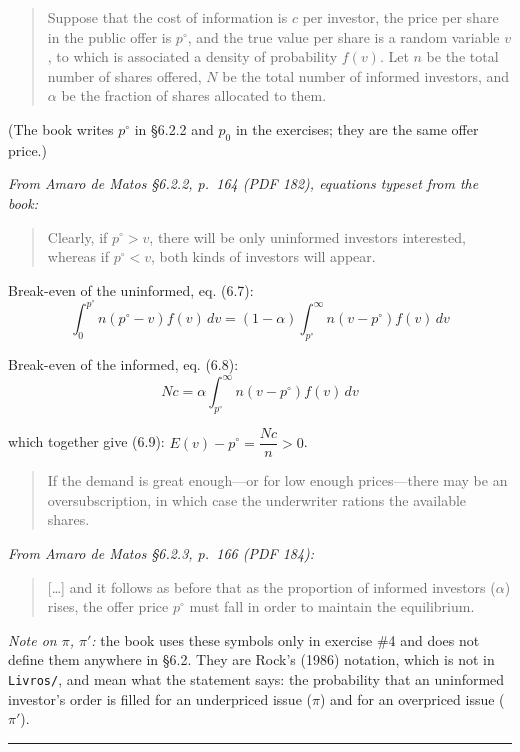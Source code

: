 \documentclass[11pt,a4paper]{article}
\newcommand{\stmtend}{\par\endgroup\nopagebreak\noindent\rule{\linewidth}{0.4pt}\par\medskip}
\begin{document}
\begin{quote}
Suppose that the cost of information is \(c\) per investor, the price per share in the public offer
is \(p^\circ\), and the true value per share is a random variable \(v\), to which is associated a
density of probability \(f(v)\). Let \(n\) be the total number of shares offered, \(N\) be the total
number of informed investors, and \(\alpha\) be the fraction of shares allocated to them.
\end{quote}

(The book writes \(p^\circ\) in §6.2.2 and \(p_0\) in the exercises; they are the same offer price.)

\emph{From Amaro de Matos §6.2.2, p.~164 (PDF 182), equations typeset from the book:}

\begin{quote}
Clearly, if \(p^\circ > v\), there will be only uninformed investors interested, whereas if
\(p^\circ < v\), both kinds of investors will appear.
\end{quote}

Break-even of the uninformed, eq. (6.7):
\[\int_0^{p^\circ} n(p^\circ - v)f(v)\,dv = (1-\alpha)\int_{p^\circ}^{\infty} n(v - p^\circ)f(v)\,dv\]

Break-even of the informed, eq. (6.8): \[Nc = \alpha\int_{p^\circ}^{\infty} n(v - p^\circ)f(v)\,dv\]

which together give (6.9): \(E(v) - p^\circ = \dfrac{Nc}{n} > 0\).

\begin{quote}
If the demand is great enough---or for low enough prices---there may be an oversubscription, in
which case the underwriter rations the available shares.
\end{quote}

\emph{From Amaro de Matos §6.2.3, p.~166 (PDF 184):}

\begin{quote}
{[}\ldots{]} and it follows as before that as the proportion of informed investors (\(\alpha\))
rises, the offer price \(p^\circ\) must fall in order to maintain the equilibrium.
\end{quote}

\emph{Note on \(\pi\), \(\pi'\):} the book uses these symbols only in exercise \#4 and does not
define them anywhere in §6.2. They are Rock's (1986) notation, which is not in \texttt{Livros/}, and
mean what the statement says: the probability that an uninformed investor's order is filled for an
underpriced issue (\(\pi\)) and for an overpriced issue (\(\pi'\)).
\stmtend
\end{document}
